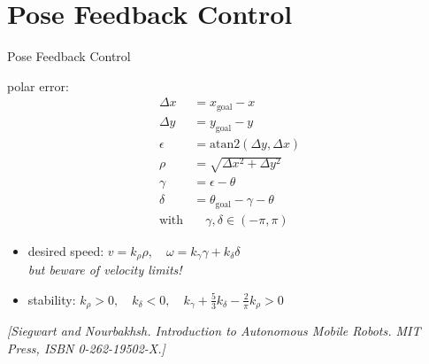 \documentclass{beamer}
\begin{document}
\section{Pose Feedback Control}
\begin{frame}{Pose Feedback Control}
  
  \begin{minipage}{0.45\columnwidth}
    \def\svgwidth{\columnwidth}
    
  \end{minipage}
  \begin{minipage}{0.5\columnwidth}
    polar error:
    \vspace{-\baselineskip}
    \begin{align*}
      \Delta x
      &=
      x_\text{goal} - x
      \\
      \Delta y
      &=
      y_\text{goal} - y
      \\
      \epsilon
      &=
      \text{atan2}(\Delta y, \Delta x)
      \\
      \rho
      &=
      \sqrt{\Delta x^2 + \Delta y^2}
      \\
      \gamma
      &=
      \epsilon - \theta
      \\
      \delta
      &=
      \theta_\text{goal} - \gamma - \theta
      \\
      \text{with}
      &\quad
      \gamma, \delta \in (-\pi, \pi)
    \end{align*}
  \end{minipage}
  
  \vfill
  \begin{itemize}
  \item
    desired speed:
    $v = k_\rho \rho,\quad \omega = k_\gamma \gamma + k_\delta \delta$\\
    \emph{but beware of velocity limits!}
  \item
    stability:
    $k_\rho > 0,\quad k_\delta < 0,\quad k_\gamma + \frac{5}{3}k_\delta - \frac{2}{\pi}k_\rho > 0$
  \end{itemize}
  
  \hfill\tiny\emph{[Siegwart and Nourbakhsh. Introduction to Autonomous Mobile Robots. MIT Press, ISBN 0-262-19502-X.]}
\end{frame}
\end{document}
